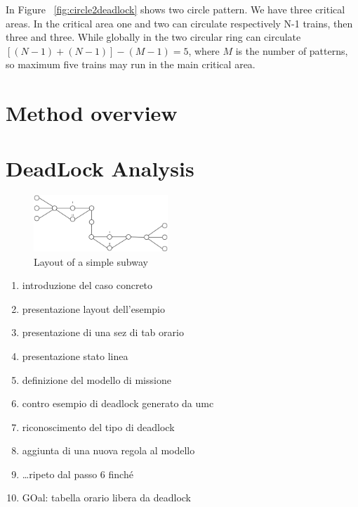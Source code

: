 \documentclass{ewic}
\begin{document}

In Figure ~\ref{fig:circle2deadlock} shows two circle pattern. We have three critical areas. In the critical area one and two can circulate respectively N-1 trains, then three and three. While globally in the two circular ring can circulate $[(N-1) + (N-1)] - (M-1)=5$, where $M$ is the number of patterns, so maximum five trains may run in the main critical area.

\section{Method overview}


\section{DeadLock Analysis}

\begin{figure}[htp]
	\begin{centering}	
	\includegraphics[width=0.45\textwidth, clip]{img/esempio}
	\caption{Layout of a simple subway}
	\label{fig:example}
	\end{centering}
\end{figure}


\begin{enumerate}
\item introduzione del caso concreto
\item presentazione layout dell'esempio
\item presentazione di una sez di tab orario
\item presentazione stato linea
\item definizione del modello di missione
\item contro esempio di deadlock generato da umc
\item riconoscimento del tipo di deadlock
\item aggiunta di una nuova regola al modello
\item \ldots ripeto dal passo 6 finch\'{e}
\item GOal: tabella orario libera da deadlock
\end{enumerate}
%
\end{document}
